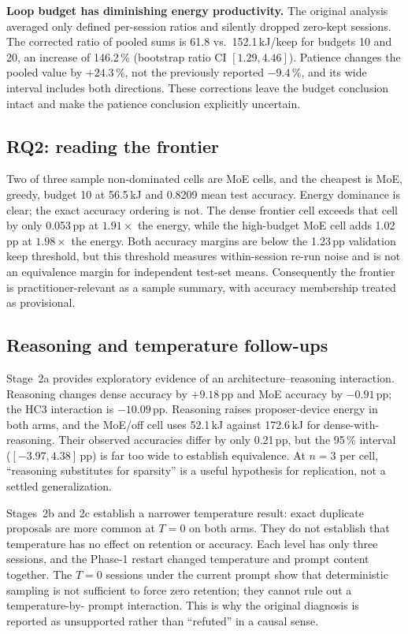 \textbf{Loop budget has diminishing energy productivity.} The original analysis
averaged only defined per-session ratios and silently dropped zero-kept sessions.
The corrected ratio of pooled sums is 61.8 vs.\ 152.1\,kJ/keep for budgets 10 and
20, an increase of 146.2\,\% (bootstrap ratio CI $[1.29,4.46]$). Patience changes
the pooled value by $+24.3\,\%$, not the previously reported $-9.4\,\%$, and its
wide interval includes both directions. These corrections leave the budget
conclusion intact and make the patience conclusion explicitly uncertain.

\subsection{RQ2: reading the frontier}

Two of three sample non-dominated cells are MoE cells, and the cheapest is MoE,
greedy, budget 10 at 56.5\,kJ and 0.8209 mean test accuracy. Energy dominance is
clear; the exact accuracy ordering is not. The dense frontier cell exceeds that
cell by only 0.053\,pp at $1.91\times$ the energy, while the high-budget MoE cell
adds 1.02\,pp at $1.98\times$ the energy. Both accuracy margins are below the
1.23\,pp validation keep threshold, but this threshold measures within-session
re-run noise and is not an equivalence margin for independent test-set means.
Consequently the frontier is practitioner-relevant as a sample summary, with
accuracy membership treated as provisional.

\subsection{Reasoning and temperature follow-ups}

Stage~2a provides exploratory evidence of an architecture--reasoning
interaction. Reasoning changes dense accuracy by $+9.18$\,pp and MoE accuracy by
$-0.91$\,pp; the HC3 interaction is $-10.09$\,pp. Reasoning raises proposer-device
energy in both arms, and the MoE/off cell uses 52.1\,kJ against 172.6\,kJ for
dense-with-reasoning. Their observed accuracies differ by only 0.21\,pp, but the
95\,\% interval ($[-3.97,4.38]$\,pp) is far too wide to establish equivalence.
At $n=3$ per cell, ``reasoning substitutes for sparsity'' is a useful hypothesis
for replication, not a settled generalization.

Stages~2b and 2c establish a narrower temperature result: exact duplicate
proposals are more common at $T=0$ on both arms. They do not establish that
temperature has no effect on retention or accuracy. Each level has only three
sessions, and the Phase-1 restart changed temperature and prompt content together.
The $T=0$ sessions under the current prompt show that deterministic sampling is
not sufficient to force zero retention; they cannot rule out a temperature-by-
prompt interaction. This is why the original diagnosis is reported as unsupported
rather than ``refuted'' in a causal sense.

